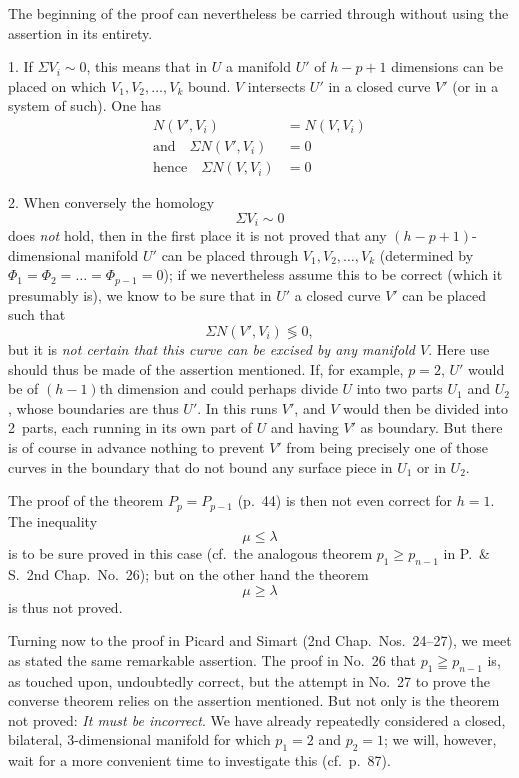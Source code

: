 \documentclass{article}
\begin{document}
The beginning of the proof can nevertheless be carried through without using the assertion in its entirety.

1. If $\Sigma V_i \sim 0$, this means that in $U$ a manifold $U'$ of $h - p + 1$ dimensions can be placed on which $V_1, V_2, \dots, V_k$ bound. $V$ intersects $U'$ in a closed curve $V'$ (or in a system of such). One has
\[
\begin{aligned}
N(V', V_i) &= N(V, V_i) \\
\text{and} \quad \Sigma N(V', V_i) &= 0 \\
\text{hence} \quad \Sigma N(V, V_i) &= 0
\end{aligned}
\]

2. When conversely the homology
\[
\Sigma V_i \sim 0
\]
does \emph{not} hold, then in the first place it is not proved that any $(h - p + 1)$-dimensional manifold $U'$ can be placed through $V_1, V_2, \dots, V_k$ (determined by $\Phi_1 = \Phi_2 = \dots = \Phi_{p-1} = 0$); if we nevertheless assume this to be correct (which it presumably is), we know to be sure that in $U'$ a closed curve $V'$ can be placed such that
\[
\Sigma N(V', V_i) \lessgtr 0,
\]
but it is \emph{not certain that this curve can be excised by any manifold $V$}. Here use should thus be made of the assertion mentioned. If, for example, $p = 2$, $U'$ would be of $(h - 1)$th dimension and could perhaps divide $U$ into two parts $U_1$ and $U_2$, whose boundaries are thus $U'$. In this runs $V'$, and $V$ would then be divided into 2~parts, each running in its own part of $U$ and having $V'$ as boundary. But there is of course in advance nothing to prevent $V'$ from being precisely one of those curves in the boundary that do not bound any surface piece in $U_1$ or in $U_2$.

The proof of the theorem $P_p = P_{p-1}$ (p.\ 44) is then not even correct for $h = 1$. The inequality
\[
\mu \le \lambda
\]
is to be sure proved in this case (cf.\ the analogous theorem $p_1 \ge p_{n-1}$ in P.\ \& S.\ 2nd Chap.\ No.\ 26); but on the other hand the theorem
\[
\mu \ge \lambda
\]
is thus not proved.

Turning now to the proof in Picard and Simart (2nd Chap.\ Nos.\ 24--27), we meet as stated the same remarkable assertion. The proof in No.\ 26 that $p_1 \geqq p_{n-1}$ is, as touched upon, undoubtedly correct, but the attempt in No.\ 27 to prove the converse theorem relies on the assertion mentioned. But not only is the theorem not proved: \emph{It must be incorrect}. We have already repeatedly considered a closed, bilateral, 3-dimensional manifold for which $p_1 = 2$ and $p_2 = 1$; we will, however, wait for a more convenient time to investigate this (cf.\ p.\ 87).
\end{document}
